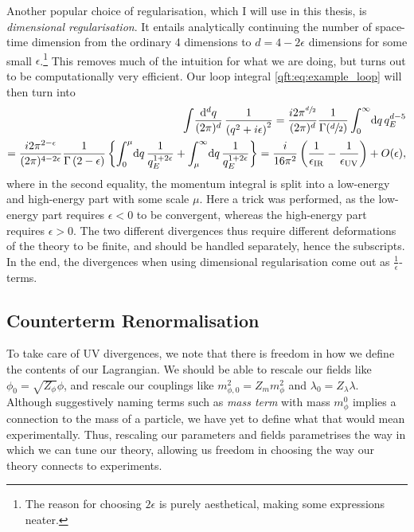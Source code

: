 \documentclass[../main.tex]{subfiles}
\begin{document}
Another popular choice of regularisation, which I will use in this thesis, is
\emph{dimensional regularisation}. It entails analytically continuing the
number of space-time dimension from the ordinary 4 dimensions to \(d
= 4-2\epsilon\) dimensions for some small \(\epsilon\).\footnote{The reason for choosing \(2\epsilon\) is purely aesthetical, making some expressions neater.} This removes much of
the intuition for what we are doing, but turns out to be computationally very
efficient. Our loop integral \cref{qft:eq:example_loop} will then turn into
\begin{align}
  \nonumber
  \loopintegral[d]{q} \frac{1}{\pclosed{q^2+i\epsilon}^2} = \frac{i
    2\pi^{\sfrac{d}{2}}}{(2\pi)^d} \frac{1}{\Gamma(\sfrac{d}{2})}
  \integral[_0^\infty]{q} q_E^{d-5} \\
  = \frac{i 2\pi^{2-\epsilon}}{(2\pi)^{4-2\epsilon}}
  \frac{1}{\Gamma\pclosed{2-\epsilon}} \cclosed{ \integral[_0^\mu]{q}
  \frac{1}{q_E^{1+2\epsilon}} + \integral[_\mu^\infty]{q}
  \frac{1}{q_E^{1+2\epsilon}} } = \frac{i}{16\pi^2}
  \pclosed{\frac{1}{\epsilon_\text{IR}} - \frac{1}{\epsilon_\text{UV}}} +
  O(\epsilon),
\end{align}
where in the second equality, the momentum integral is split into a low-energy
and high-energy part with some scale \(\mu\). Here a trick was performed, as
the low-energy part requires \(\epsilon < 0\) to be convergent, whereas the
high-energy part requires \(\epsilon>0\). The two different divergences thus
require different deformations of the theory to be finite, and should be
handled separately, hence the subscripts. In the end, the divergences when using
dimensional regularisation come out as \(\frac{1}{\epsilon}\)-terms.






\subsection{Counterterm Renormalisation}
To take care of UV divergences, we note that there is freedom in how we define
the contents of our Lagrangian. We should be able to rescale our fields like \(\phi_0 =
\sqrt{Z_\phi} \phi\), and rescale our couplings like \(m_{\phi,0}^2 = Z_m
m_\phi^2\) and \(\lambda_0 = Z_\lambda \lambda\). Although suggestively naming
terms such as \emph{mass term} with mass \(m_\phi^0\) implies a connection to
the mass of a particle, we have yet to define what that would mean
experimentally. Thus, rescaling our parameters and fields parametrises the way
in which we can tune our theory, allowing us freedom in choosing the way our
theory connects to experiments.
\end{document}
